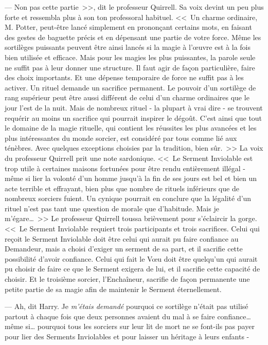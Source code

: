 --- Non pas cette partie~>>, dit le professeur Quirrell. Sa voix devint un peu plus forte et ressembla plus à son ton professoral habituel. <<~Un charme ordinaire, M. Potter, peut-être lancé simplement en prononçant certains mots, en faisant des gestes de baguette précis et en dépensant une partie de votre force. Même les sortilèges puissants peuvent être ainsi lancés si la magie à l'œuvre est à la fois bien utilisée et efficace. Mais pour les magies les plus puissantes, la parole seule ne suffit pas à leur donner une structure. Il faut agir de façon particulière, faire des choix importants. Et une dépense temporaire de force ne suffit pas à les activer. Un rituel demande un sacrifice permanent. Le pouvoir d'un sortilège de rang supérieur peut être aussi différent de celui d'un charme ordinaires que le jour l'est de la nuit. Mais de nombreux rituel - la plupart à vrai dire - se trouvent requérir au moins un sacrifice qui pourrait inspirer le dégoût. C'est ainsi que tout le domaine de la magie rituelle, qui contient les réussites les plus avancées et les plus intéressantes du monde sorcier, est considéré par tous comme lié aux ténèbres. Avec quelques exceptions choisies par la tradition, bien sûr.~>> La voix du professeur Quirrell prit une note sardonique. <<~Le Serment Inviolable est trop utile à certaines maisons fortunées pour être rendu entièrement illégal - même si lier la volonté d'un homme jusqu'à la fin de ses jours est bel et bien un acte terrible et effrayant, bien plus que nombre de rituels inférieurs que de nombreux sorciers fuient. Un cynique pourrait en conclure que la légalité d'un rituel n'est pas tant une question de morale que d'habitude. Mais je m'égare…~>> Le professeur Quirrell toussa brièvement pour s'éclaircir la gorge. <<~Le Serment Inviolable requiert trois participants et trois sacrifices. Celui qui reçoit le Serment Inviolable doit être celui qui aurait pu faire confiance au Demandeur, mais a choisi d'exiger un serment de sa part, et il sacrifie cette possibilité d'avoir confiance. Celui qui fait le Vœu doit être quelqu'un qui aurait pu choisir de faire ce que le Serment exigera de lui, et il sacrifie cette capacité de choisir. Et le troisième sorcier, l'Enchaîneur, sacrifie de façon permanente une petite partie de sa magie afin de maintenir le Serment éternellement.

--- Ah, dit Harry. Je \emph{m'étais demandé} pourquoi ce sortilège n'était pas utilisé partout à chaque fois que deux personnes avaient du mal à se faire confiance… même si… pourquoi tous les sorciers sur leur lit de mort ne se font-ils pas payer pour lier des Serments Inviolables et pour laisser un héritage à leurs enfants -

